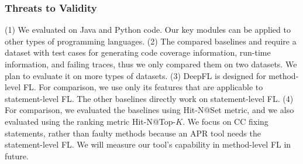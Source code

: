 \subsubsection{Threats to Validity}
(1) We evaluated {\tool} on Java and Python code. Our key modules can
be applied to other types of programming languages.  (2) The compared
baselines and {\tool} require a dataset with test cases for generating
code coverage information, run-time information, and failing traces,
thus we only compared them on two datasets. We plan to evaluate it on
more types of datasets. (3) DeepFL is designed for method-level
FL. For comparison, we use only its features that are
applicable to statement-level FL. The other baselines
directly work on statement-level FL. (4) For comparison, we
evaluated the baselines using Hit-N@Set metric, and we also evaluated
{\tool} using the ranking metric Hit-N@Top-$K$. We focus on CC fixing
statements, rather than faulty methods because an APR tool needs the
statement-level FL. We will measure our tool's capability in
method-level FL in future.



